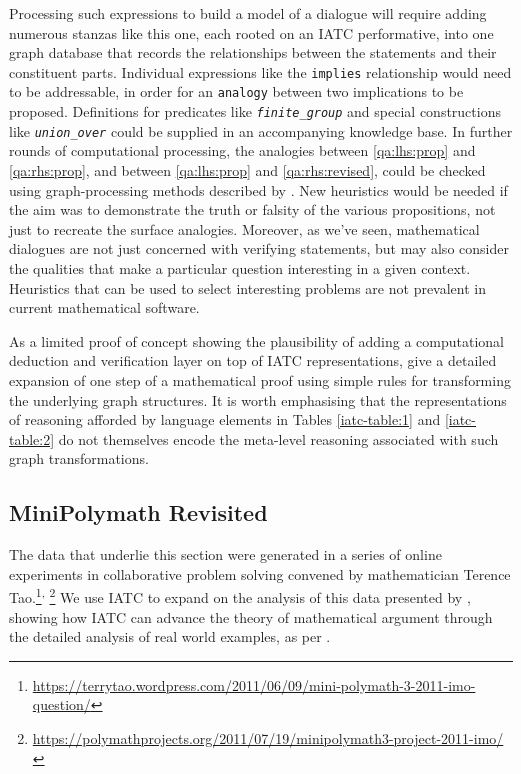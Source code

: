 \documentclass[smallextended,oneside]{svjour3}       %
\newcommand\nothing[1]{#1}
\let\thesis\nothing
\begin{document}
{Processing such expressions to build a model of a dialogue
will require adding numerous stanzas like this one, each rooted on an IATC
performative, into one graph database that records the relationships
between the statements and their constituent parts.  Individual expressions
like the \texttt{implies} relationship would need to be addressable,
in order for an \texttt{analogy} between two implications to be
proposed.
Definitions for predicates like \texttt{\textit{finite_group}}
and special constructions like \texttt{\textit{union_over}}
could be supplied in an accompanying knowledge base.   In further rounds of
computational processing, the analogies between
\ref{qa:lhs:prop} and \ref{qa:rhs:prop}, and between
\ref{qa:lhs:prop} and \ref{qa:rhs:revised}, could be checked
 using graph-processing methods described
by \citet{sowa2003analogical}.  
New heuristics would be needed
if the aim was to demonstrate the truth or falsity of the various
propositions, not just to recreate the surface analogies.
Moreover, as we've seen, mathematical dialogues are not just concerned
with verifying statements, but may
also consider the qualities that make a particular
question interesting in a given context.   Heuristics that can 
be used to select interesting problems are not prevalent in current 
mathematical software.

As a limited proof of concept showing the plausibility of adding a
computational deduction and verification layer on top of IATC
representations, \citet{corneli2017modelling} give a detailed
expansion of one step of a mathematical proof using simple rules
for transforming the underlying graph structures.
It is worth emphasising that the representations
of reasoning afforded by language elements in Tables
\ref{iatc-table:1} and \ref{iatc-table:2} do not themselves
encode the meta-level reasoning associated with such graph transformations.



\subsection{MiniPolymath Revisited}\label{iatc-examples:minipolymath}

The data that underlie this section were generated in a series of online experiments in collaborative problem solving convened by mathematician Terence Tao.\footnote{\url{https://terrytao.wordpress.com/2011/06/09/mini-polymath-3-2011-imo-question/}}\textsuperscript{,}%
\footnote{\url{https://polymathprojects.org/2011/07/19/minipolymath3-project-2011-imo/}}
\thesis{We use IATC to expand on the analysis of
  this data presented by \citet{pease-and-martin},} showing how IATC can
advance the theory of mathematical argument through the
detailed analysis of real world examples, as per \citet{Carrascal2015}.

}
\end{document}
